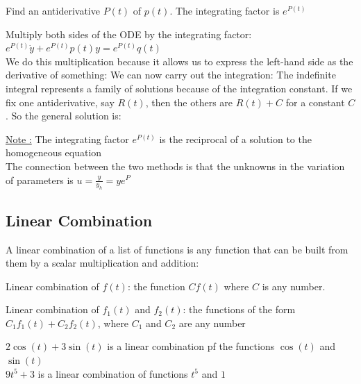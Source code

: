 \documentclass[11pt, openright]{book}
\begin{document}
\begin{dent}{}
    \begin{items}{-15pt}{-15pt}
        \item Find an antiderivative $P(t)$ of $p(t)$. The integrating factor is $e^{P(t)}$
        \item Multiply both sides of the ODE by the integrating factor: $e^{P(t)}\dot{y}+e^{P(t)}p(t)y=e^{P(t)}q(t)$\\
        We do this multiplication because it allows us to express the left-hand side as the derivative of something:
        We can now carry out the integration:
        The indefinite integral represents a family of solutions because of the integration constant. If we fix one antiderivative, say $R(t)$, then the others are $R(t)+C$ for a constant $C$. So the general solution is:
    \end{items}

    \uline{Note :}\hspace{2mm} The integrating factor $e^{P(t)}$ is the reciprocal of a solution to the homogeneous equation\\
    The connection between the two methods is that the unknowns in the variation of parameters is $u=\frac{y}{y_h}=ye^{P}$

\end{dent}

\subsection{Linear Combination}

A linear combination of a list of functions is any function that can be built from them by a scalar multiplication and addition:
\begin{items}{-15pt}{-15pt}
    \item Linear combination of $f(t)$: the function $Cf(t)$ where $C$ is any number.
    \item Linear combination of $f_1(t)$ and $f_2(t)$: the functions of the form $C_1f_1(t)+C_2f_2(t)$, where $C_1$ and $C_2$ are any number
\end{items}

\begin{dent}{}
    $2\cos(t)+3\sin(t)$ is a linear combination pf the functions $\cos(t)$ and $\sin(t)$\\
    $9t^5+3$ is a linear combination of functions $t^5$ and $1$
\end{dent}
\end{document}
